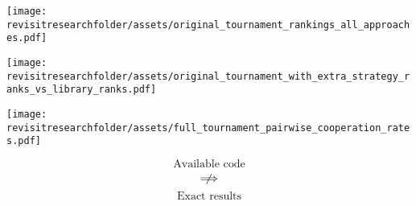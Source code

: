 \documentclass{beamer}
\newcommand{\revisitresearchfolder}{$HOME/rsc/revisiting-axelrod-second}
\begin{document}
    \begin{frame}
        \begin{center}
            \texttt{[image: \\revisitresearchfolder/assets/original\_tournament\_rankings\_all\_approaches.pdf]}
        \end{center}

    \end{frame}

    \begin{frame}
        \begin{center}
            \texttt{[image: \\revisitresearchfolder/assets/original\_tournament\_with\_extra\_strategy\_ranks\_vs\_library\_ranks.pdf]}
        \end{center}

    \end{frame}

    \begin{frame}
        \begin{center}
            \texttt{[image: \\revisitresearchfolder/assets/full\_tournament\_pairwise\_cooperation\_rates.pdf]}
        \end{center}

    \end{frame}

    \begin{frame}

        \begin{center}
            \Huge
            \[
                \text{Available code}
            \]
            \[
                \centernot\implies
            \]
            \[
                \text{Exact results}
            \]
        \end{center}

    \end{frame}
\end{document}
